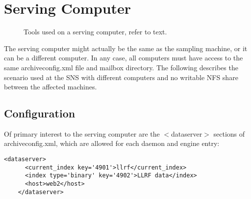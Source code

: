 \section{Serving Computer}  \label{sec:exampleServe}
\begin{figure}[htb]
\begin{center}
\end{center}
\caption{\label{fig:acServe}Tools used on a serving computer, refer to text.}
\end{figure}

\noindent The serving computer might actually be the same as the
sampling machine, or it can be a different computer. In any case, all
computers must have access to the same archiveconfig.xml file and
mailbox directory.
The following describes the scenario used at the SNS with 
different computers and no writable NFS share between the
affected machines.

\subsection{Configuration}
Of primary interest to the serving computer are the $<$dataserver$>$
sections of archiveconfig.xml, which are allowed for each daemon and
engine entry:

\begin{lstlisting}[frame=none,keywordstyle=\sffamily]
   <dataserver>
      <current_index key='4901'>llrf</current_index>
      <index type='binary' key='4902'>LLRF data</index>
      <host>web2</host>
    </dataserver>
\end{lstlisting}

